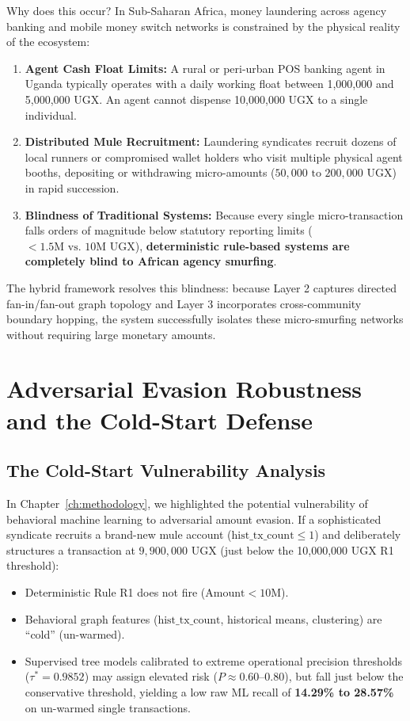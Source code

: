 Why does this occur? In Sub-Saharan Africa, money laundering across agency banking and mobile money switch networks is constrained by the physical reality of the ecosystem:
\begin{enumerate}
    \item \textbf{Agent Cash Float Limits:} A rural or peri-urban POS banking agent in Uganda typically operates with a daily working float between 1,000,000 and 5,000,000 UGX. An agent cannot dispense 10,000,000 UGX to a single individual.
    \item \textbf{Distributed Mule Recruitment:} Laundering syndicates recruit dozens of local runners or compromised wallet holders who visit multiple physical agent booths, depositing or withdrawing micro-amounts ($50,000\text{ to }200,000\text{ UGX}$) in rapid succession.
    \item \textbf{Blindness of Traditional Systems:} Because every single micro-transaction falls orders of magnitude below statutory reporting limits ($< 1.5\text{M vs. }10\text{M UGX}$), \textbf{deterministic rule-based systems are completely blind to African agency smurfing}.
\end{enumerate}
The hybrid framework resolves this blindness: because Layer 2 captures directed fan-in/fan-out graph topology and Layer 3 incorporates cross-community boundary hopping, the system successfully isolates these micro-smurfing networks without requiring large monetary amounts.

\section{Adversarial Evasion Robustness and the Cold-Start Defense}
\subsection{The Cold-Start Vulnerability Analysis}
In Chapter~\ref{ch:methodology}, we highlighted the potential vulnerability of behavioral machine learning to adversarial amount evasion. If a sophisticated syndicate recruits a brand-new mule account ($\text{hist\_tx\_count} \le 1$) and deliberately structures a transaction at $9,900,000\text{ UGX}$ (just below the 10,000,000 UGX R1 threshold):
\begin{itemize}
    \item Deterministic Rule R1 does not fire ($\text{Amount} < 10\text{M}$).
    \item Behavioral graph features ($\text{hist\_tx\_count}$, historical means, clustering) are ``cold'' (un-warmed).
    \item Supervised tree models calibrated to extreme operational precision thresholds ($\tau^* = 0.9852$) may assign elevated risk ($P \approx 0.60\text{--}0.80$), but fall just below the conservative threshold, yielding a low raw ML recall of \textbf{14.29\% to 28.57\%} on un-warmed single transactions.
\end{itemize}

